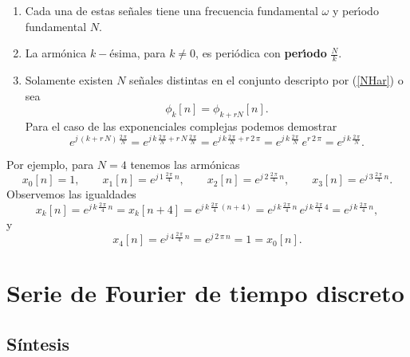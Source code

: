 \begin{enumerate}
\item  Cada una de estas se\~{n}ales tiene una frecuencia fundamental $\omega $ y 
per\'{\i}odo fundamental $N$.

\item  La arm\'{o}nica $k-$ésima, para $k \neq 0$, es peri\'{o}dica con \textbf{per\'{\i}odo }$\frac{N}{k}$.

\item  Solamente existen $N$ se\~{n}ales distintas en el conjunto descripto
por (\ref{NHar}) o sea 
\begin{equation}
\phi _{k}\left[ n\right] =\phi _{k+rN}\left[ n\right].
\end{equation}
Para el caso de las exponenciales complejas podemos demostrar
\begin{equation}
e^{j \, (k + r \, N) \, \frac{2 \, \pi}{N}} =
e^{j \, k \, \frac{2 \, \pi}{N} + r \, N \, \frac{2 \, \pi}{N}} =
e^{j \, k \, \frac{2 \, \pi}{N} + r \, 2 \, \pi} =
e^{j \, k \, \frac{2 \, \pi}{N}} \, e^{r \, 2 \, \pi} = 
e^{j \, k \, \frac{2 \, \pi}{N}}.
\end{equation}

\end{enumerate}

Por ejemplo, para $N = 4$ tenemos las armónicas
\begin{equation}
 x_{0}[n] = 1, 
 \qquad x_{1}[n] = e^{j \, 1 \, \frac{2 \, \pi}{4} \, n}, 
 \qquad x_{2}[n] = e^{j \, 2 \, \frac{2 \, \pi}{4} \, n}, 
 \qquad x_{3}[n] = e^{j \, 3 \, \frac{2 \, \pi}{4} \, n}.
\end{equation}
Observemos las igualdades
\begin{equation}
 x_{k}[n] = e^{j \, k \, \frac{2 \, \pi}{4} \, n} = x_{k}[n + 4] = e^{j \, k \, \frac{2 \, \pi}{4} \, (n + 4)} =
 e^{j \, k \, \frac{2 \, \pi}{4} \, n} \, e^{j \, k \, \frac{2 \, \pi}{4} \, 4} =
  e^{j \, k \, \frac{2 \, \pi}{4} \, n},
\end{equation}
y
\begin{equation}
 x_{4}[n] = e^{j \, 4 \, \frac{2 \, \pi}{4} \, n} = e^{j \, 2 \, \pi \, n} = 1 = x_{0}[n].
\end{equation}


\section{Serie de Fourier de tiempo discreto}

\subsection{Síntesis}

